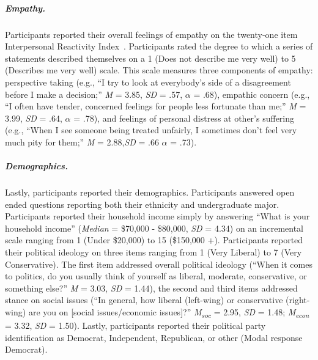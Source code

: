 \documentclass{sfuthesis}
\begin{document}
\subparagraph{Empathy.} Participants reported their overall feelings of empathy on the twenty-one item Interpersonal Reactivity Index~\cite{davis80}. Participants rated the degree to which a series of statements described themselves on a 1 (Does not describe me very well) to 5 (Describes me very well) scale. This scale measures three components of empathy: perspective taking (e.g., “I try to look at everybody’s side of a disagreement before I make a decision;” \textit{M} = 3.85, \textit{SD} = .57, $\alpha$ = .68), empathic concern (e.g., “I often have tender, concerned feelings for people less fortunate than me;” \textit{M} = 3.99, \textit{SD} = .64, $\alpha$ = .78), and feelings of personal distress at other’s suffering (e.g., “When I see someone being treated unfairly, I sometimes don’t feel very much pity for them;” \textit{M} = 2.88,\textit{SD} = .66 $\alpha$ = .73).
	
\subparagraph{Demographics.} Lastly, participants reported their demographics. Participants answered open ended questions reporting both their ethnicity and undergraduate major. Participants reported their household income simply by answering “What is your household income” (\textit{Median} = \$70,000 - \$80,000, \textit{SD} = 4.34) on an incremental scale ranging from 1 (Under \$20,000) to 15 (\$150,000 +). Participants reported their political ideology on three items ranging from 1 (Very Liberal) to 7 (Very Conservative). The first item addressed overall political ideology (“When it comes to politics, do you usually think of yourself as liberal, moderate, conservative, or something else?” \textit{M} = 3.03, \textit{SD} = 1.44), the second and third items addressed stance on social issues (“In general, how liberal (left-wing) or conservative (right-wing) are you on [social issues/economic issues]?” \textit{M\textsubscript{soc}} = 2.95, \textit{SD} = 1.48; \textit{M\textsubscript{econ}} = 3.32, \textit{SD} = 1.50). Lastly, participants reported their political party identification as Democrat, Independent, Republican, or other (Modal response Democrat).
\end{document}
